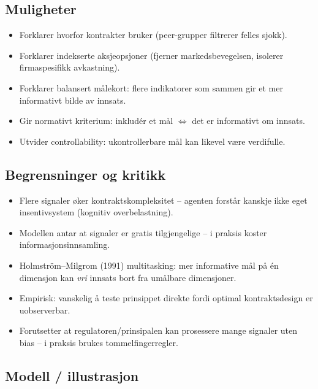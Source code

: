 \subsection*{Muligheter}
\begin{itemize}
\item Forklarer hvorfor kontrakter bruker  (peer-grupper filtrerer felles sjokk).
\item Forklarer indekserte aksjeopsjoner (fjerner markedsbevegelsen, isolerer firmaspesifikk avkastning).
\item Forklarer balansert målekort: flere indikatorer som sammen gir et mer informativt bilde av innsats.
\item Gir normativt kriterium: inkludér et mål $\Leftrightarrow$ det er informativt om innsats.
\item Utvider controllability: ukontrollerbare mål kan likevel være verdifulle.
\end{itemize}

\subsection*{Begrensninger og kritikk}
\begin{itemize}
\item Flere signaler øker kontraktskompleksitet -- agenten forstår kanskje ikke eget insentivsystem (kognitiv overbelastning).
\item Modellen antar at signaler er gratis tilgjengelige -- i praksis koster informasjonsinnsamling.
\item Holmström--Milgrom (1991) multitasking: mer informative mål på én dimensjon kan \emph{vri} innsats bort fra umålbare dimensjoner.
\item Empirisk: vanskelig å teste prinsippet direkte fordi optimal kontraktsdesign er uobserverbar.
\item Forutsetter at regulatoren/prinsipalen kan prosessere mange signaler uten bias -- i praksis brukes tommelfingerregler.
\end{itemize}

\subsection*{Modell / illustrasjon}

